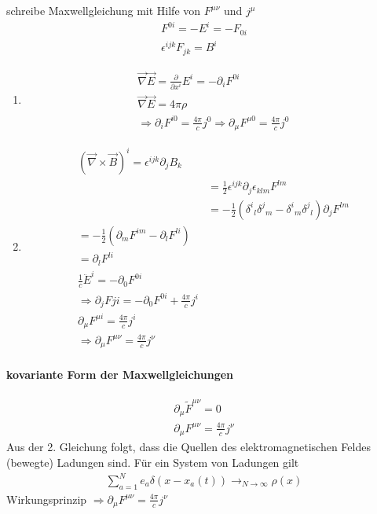 \documentclass[a4paper]{article}
\begin{document}
schreibe Maxwellgleichung mit Hilfe von $F^{\mu\nu}$ und $j^\mu$
\begin{align}
F^{0i}=-E^i=-F_{0i}\\
\epsilon^{ijk}F_{jk}=B^i
\end{align}
\begin{enumerate}
  \item \begin{align}
  \vec{\nabla}\vec{E}=\frac{\partial}{\partial x^i}E^i=-\partial_i F^{0i}\\
  \vec{\nabla}\vec{E}=4\pi\rho\\
  \Rightarrow \partial_iF^{i0}=\frac{4\pi}{c}j^0
  \Rightarrow \partial_\mu F^{\mu0}=\frac{4\pi}{c}j^0
  \end{align}
  \item \begin{align}
  (\vec{\nabla}\times\vec{B})^i=\epsilon^{ijk}\partial_jB_k\\
  &=\frac{1}{2}\epsilon^{ijk}\partial_j\epsilon_{klm}F^{lm}\\
  &=-\frac{1}{2}\left(\delta^i{}_l \delta^j{}_m -
  \delta^i{}_m \delta^j{}_l \right) \partial_jF^{lm}\\
  =-\frac{1}{2}\left(\partial_mF^{im}- \partial_lF^{li}\right)\\
  =  \partial_l F^{li}\\
  \frac{1}{c}\ddot{E}^i=-\partial_0F^{0i}\\
  \Rightarrow \partial_j F{ji}=-\partial_0F^{0i}+\frac{4\pi}{c}j^i\\
  \partial_\mu F^{\mu i}=\frac{4\pi}{c}j^i\\
  \Rightarrow \partial_\mu F^{\mu \nu}=\frac{4\pi}{c}j^\nu
  \end{align}
\end{enumerate}
\paragraph{kovariante Form der Maxwellgleichungen}
\begin{align}
\partial_\mu\tilde{F}^{\mu\nu}=0\\
\partial_\mu F^{\mu \nu}=\frac{4\pi}{c}j^\nu
\end{align}
Aus der 2. Gleichung folgt, dass die Quellen des elektromagnetischen Feldes
(bewegte) Ladungen sind.
Für ein System von Ladungen gilt
\begin{align}
\sum_{a=1}^N e_a \delta(x-x_a(t))\rightarrow_{N\rightarrow\infty}\rho(x)
\end{align} 
Wirkungsprinzip $\Rightarrow \partial_\mu F^{\mu \nu}=\frac{4\pi}{c}j^\nu$\\
\end{document}
